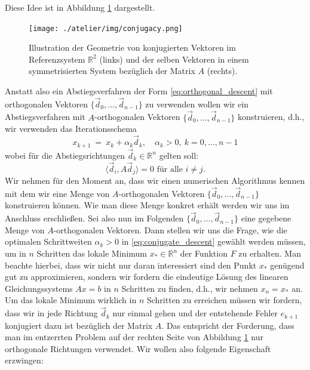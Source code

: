 Diese Idee ist in Abbildung \ref{fig:conjugacy} dargestellt.
\begin{figure}[tbh]
\centering
\texttt{[image: ./atelier/img/conjugacy.png]}
\caption{Illustration der Geometrie von konjugierten Vektoren im Referenzsystem $\mathbb{R}^2$ (links) und der selben Vektoren in einem symmetrisierten System bezüglich der Matrix $A$ (rechts).}
\label{fig:conjugacy}
\end{figure}

Anstatt also ein Abstiegsverfahren der Form \eqref{eq:orthogonal_descent} mit orthogonalen Vektoren $\lbrace \vec{d}_0, \ldots, \vec{d}_{n-1}\rbrace$ zu verwenden wollen wir ein Abstiegsverfahren mit $A$-orthogonalen Vektoren $\lbrace \vec{d}_0, \ldots, \vec{d}_{n-1}\rbrace$ konstruieren, d.h., wir verwenden das Iterationsschema
\begin{equation}
\label{eq:conjugate_descent}
x_{k+1} \ = \ x_k + \alpha_k \vec{d}_k, \quad \alpha_k > 0, \ k=0,\ldots,n-1
\end{equation}
wobei für die Abstiegsrichtungen $\vec{d}_k \in \mathbb{R}^n$ gelten soll:
\begin{equation*}
\langle \vec{d}_i, A\vec{d}_j \rangle = 0 \text{ für alle } i\neq j.
\end{equation*}
Wir nehmen für den Moment an, dass wir einen numerischen Algorithmus kennen mit dem wir eine Menge von $A$-orthogonalen Vektoren $\lbrace \vec{d}_0, \ldots, \vec{d}_{n-1} \rbrace$ konstruieren können.
Wie man diese Menge konkret erhält werden wir uns im Anschluss erschließen.
Sei also nun im Folgenden $\lbrace \vec{d}_0, \ldots, \vec{d}_{n-1} \rbrace$ eine gegebene Menge von $A$-orthogonalen Vektoren.
Dann stellen wir uns die Frage, wie die optimalen Schrittweiten $\alpha_k > 0$ in \eqref{eq:conjugate_descent} gewählt werden müssen, um in $n$ Schritten das lokale Minimum $x_* \in \mathbb{R}^n$ der Funktion $F$ zu erhalten.
Man beachte hierbei, dass wir nicht nur daran interessiert sind den Punkt $x_*$ genügend gut zu approximieren, sondern wir fordern die eindeutige Lösung des linearen Gleichungssystems $Ax = b$ in $n$ Schritten zu finden, d.h., wir nehmen $x_n = x_*$ an.
Um das lokale Minimum wirklich in $n$ Schritten zu erreichen müssen wir fordern, dass wir in jede Richtung $\vec{d}_k$ nur einmal gehen und der entstehende Fehler $e_{k+1}$ konjugiert dazu ist bezüglich der Matrix $A$.
Das entspricht der Forderung, dass man im entzerrten Problem auf der rechten Seite von Abbildung \ref{fig:conjugacy} nur orthogonale Richtungen verwendet.
Wir wollen also folgende Eigenschaft erzwingen:
